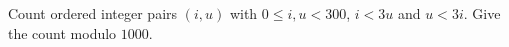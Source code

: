 Count ordered integer pairs $(i,u)$ with $0\le i,u<300$, $i<3u$ and $u<3i$. Give the count modulo $1000$.
